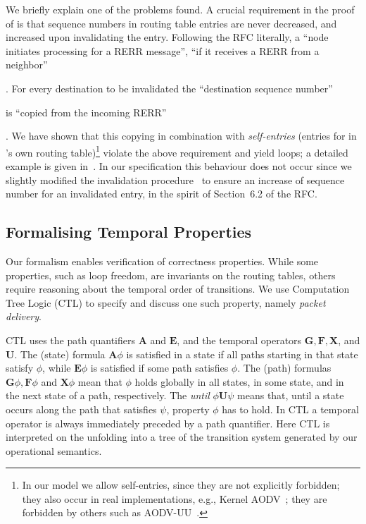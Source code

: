 \documentclass[envcountsame,envcountsect,orivec,runningheads]{llncs}
\begin{document}
We briefly explain one of the problems found.
A crucial requirement in the proof of  is that sequence
numbers in routing table entries are never decreased, and increased upon invalidating the entry.
Following the RFC literally, a ``node initiates processing for a RERR message''\footnotemark, ``if it receives a RERR from a neighbor''\addtocounter{footnote}{-1}\footnotemark.
For every destination to be invalidated the ``destination sequence number''\addtocounter{footnote}{-1}\footnotemark{} is ``copied from the incoming RERR''\addtocounter{footnote}{-1}\footnotemark.
We have shown that this copying in combination with {\em
  self-entries} (entries for  in 's own routing
table)\footnote{In our model we allow self-entries, since they are not explicitly forbidden;
they also occur in real implementations, e.g., Kernel AODV~\cite{AODVNIST}; they are forbidden by others such as
AODV-UU~\cite{AODVUU}.} violate the above requirement and yield loops; a detailed example is given in~\cite{TR11}.
In our specification this behaviour does not occur since we slightly
modified the invalidation procedure~\cite[Sect. 5]{TR11}
to ensure an increase of sequence number for an invalidated entry, in  the spirit of
  Section~6.2 of the RFC.


\subsection{Formalising Temporal Properties}\label{sec:properties}
Our formalism  enables verification of correctness properties. While
some properties, such as loop freedom, are invariants on the routing
tables, others require reasoning about the temporal order of
transitions. We use Computation Tree Logic (CTL) to specify and
discuss one such property, namely \emph{packet delivery}.

CTL uses the path quantifiers $\mathbf{A}$ and $\mathbf{E}$, and the temporal operators $\mathbf{G}, \mathbf{F}, \mathbf{X}$, and $\mathbf{U}$. The (state) formula $\mathbf{A} \phi$ is satisfied in a state if all paths starting in that state satisfy $\phi$, while $\mathbf{E} \phi$ is satisfied if some path satisfies $\phi$. The (path) formulas $\mathbf{G} \phi, \mathbf{F} \phi$ and $\mathbf{X} \phi$ mean that $\phi$ holds globally in all states, in some state, and in the next state of a path, respectively. The \emph{until}  $\phi \mathbf{U} \psi$ means that, until a state occurs along the path that satisfies $\psi$, property $\phi$ has to hold. In CTL a temporal operator is always immediately preceded by a path quantifier. 
Here CTL is interpreted on the unfolding into a tree of the transition system
  generated by our operational semantics.
\end{document}
